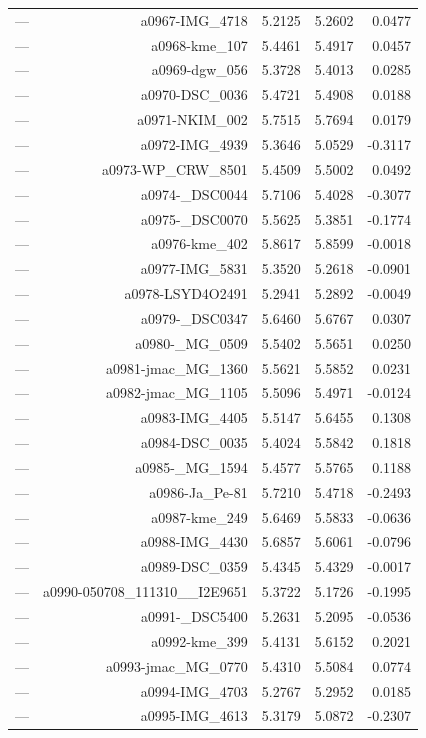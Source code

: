 \begin{table}[htbp]
\begin{tabular}{lrrrr}
— & a0967-IMG_4718 & 5.2125 & 5.2602 & 0.0477 \\
— & a0968-kme_107 & 5.4461 & 5.4917 & 0.0457 \\
— & a0969-dgw_056 & 5.3728 & 5.4013 & 0.0285 \\
— & a0970-DSC_0036 & 5.4721 & 5.4908 & 0.0188 \\
— & a0971-NKIM_002 & 5.7515 & 5.7694 & 0.0179 \\
— & a0972-IMG_4939 & 5.3646 & 5.0529 & -0.3117 \\
— & a0973-WP_CRW_8501 & 5.4509 & 5.5002 & 0.0492 \\
— & a0974-_DSC0044 & 5.7106 & 5.4028 & -0.3077 \\
— & a0975-_DSC0070 & 5.5625 & 5.3851 & -0.1774 \\
— & a0976-kme_402 & 5.8617 & 5.8599 & -0.0018 \\
— & a0977-IMG_5831 & 5.3520 & 5.2618 & -0.0901 \\
— & a0978-LSYD4O2491 & 5.2941 & 5.2892 & -0.0049 \\
— & a0979-_DSC0347 & 5.6460 & 5.6767 & 0.0307 \\
— & a0980-_MG_0509 & 5.5402 & 5.5651 & 0.0250 \\
— & a0981-jmac_MG_1360 & 5.5621 & 5.5852 & 0.0231 \\
— & a0982-jmac_MG_1105 & 5.5096 & 5.4971 & -0.0124 \\
— & a0983-IMG_4405 & 5.5147 & 5.6455 & 0.1308 \\
— & a0984-DSC_0035 & 5.4024 & 5.5842 & 0.1818 \\
— & a0985-_MG_1594 & 5.4577 & 5.5765 & 0.1188 \\
— & a0986-Ja_Pe-81 & 5.7210 & 5.4718 & -0.2493 \\
— & a0987-kme_249 & 5.6469 & 5.5833 & -0.0636 \\
— & a0988-IMG_4430 & 5.6857 & 5.6061 & -0.0796 \\
— & a0989-DSC_0359 & 5.4345 & 5.4329 & -0.0017 \\
— & a0990-050708_111310__I2E9651 & 5.3722 & 5.1726 & -0.1995 \\
— & a0991-_DSC5400 & 5.2631 & 5.2095 & -0.0536 \\
— & a0992-kme_399 & 5.4131 & 5.6152 & 0.2021 \\
— & a0993-jmac_MG_0770 & 5.4310 & 5.5084 & 0.0774 \\
— & a0994-IMG_4703 & 5.2767 & 5.2952 & 0.0185 \\
— & a0995-IMG_4613 & 5.3179 & 5.0872 & -0.2307 \\

\end{tabular}
\end{table}
